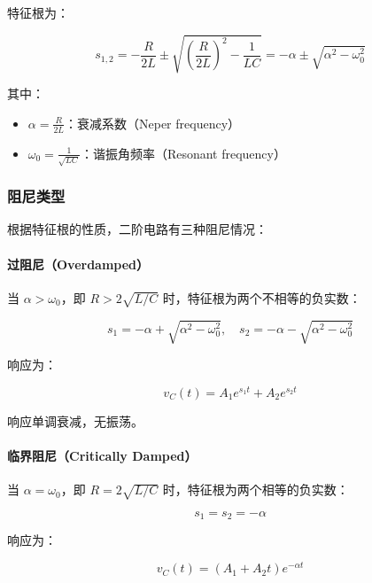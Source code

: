 特征根为：

\begin{equation}
s_{1,2} = -\frac{R}{2L} \pm \sqrt{\left(\frac{R}{2L}\right)^2 - \frac{1}{LC}} = -\alpha \pm \sqrt{\alpha^2 - \omega_0^2} \label{eq:characteristic-roots}
\end{equation}

其中：
\begin{itemize}
  \item $\alpha = \frac{R}{2L}$：衰减系数（Neper frequency）
  \item $\omega_0 = \frac{1}{\sqrt{LC}}$：谐振角频率（Resonant frequency）
\end{itemize}

\subsubsection{阻尼类型}

根据特征根的性质，二阶电路有三种阻尼情况：

\paragraph{过阻尼（Overdamped）}

当 $\alpha > \omega_0$，即 $R > 2\sqrt{L/C}$ 时，特征根为两个不相等的负实数：

\begin{equation}
s_1 = -\alpha + \sqrt{\alpha^2 - \omega_0^2}, \quad s_2 = -\alpha - \sqrt{\alpha^2 - \omega_0^2}
\end{equation}

响应为：

\begin{equation}
v_C(t) = A_1 e^{s_1 t} + A_2 e^{s_2 t} \label{eq:overdamped-response}
\end{equation}

响应单调衰减，无振荡。

\paragraph{临界阻尼（Critically Damped）}

当 $\alpha = \omega_0$，即 $R = 2\sqrt{L/C}$ 时，特征根为两个相等的负实数：

\begin{equation}
s_1 = s_2 = -\alpha
\end{equation}

响应为：

\begin{equation}
v_C(t) = (A_1 + A_2 t) e^{-\alpha t} \label{eq:critically-damped-response}
\end{equation}

